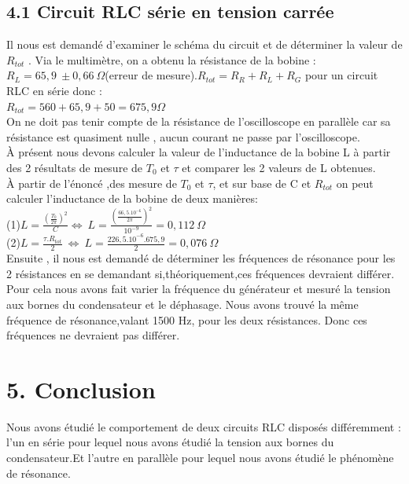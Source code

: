 \documentclass{report}
\begin{document}
\subsection*{4.1 Circuit RLC série en tension carrée}
Il nous est demandé d'examiner le schéma du circuit et de déterminer la valeur de $R_{tot}$ .
Via le multimètre, on a  obtenu la résistance de la bobine : $R_L=65,9\ \pm0,66\ \Omega$(erreur de mesure).$R_{tot}=R_R+R_L+R_G$ pour un circuit RLC en série donc : \\
\hspace*{5cm} $R_{tot}=560+65,9+50=675,9\Omega$\\
On ne doit pas tenir compte de la résistance de l'oscilloscope en parallèle car sa résistance est quasiment nulle , aucun courant ne passe par l'oscilloscope.\\
À présent nous devons calculer la valeur de l'inductance de la bobine L à partir des 2 résultats de mesure de $T_0$ et $\tau$ et comparer les 2 valeurs de L obtenues.\\ À partir de l'énoncé ,des mesure de $T_0$ et $\tau$, et sur base de C et $R_{tot}$ on peut calculer l'inductance de la bobine de deux manières:\\
\hspace*{2cm}(1)$L=\frac{\left({\frac{T_0}{2\pi}}\right)^2}{C} \Leftrightarrow $$ \ L = \frac{{\left(\frac{66,5.10^{-6}}{2\pi}\right)}^2}{10^{-9}}=0,112\ \Omega$
\\
\hspace*{2cm}(2)$L=\frac{\tau .R_{tot}}{2} \ $$ \Leftrightarrow $$ \ L=\frac{226,5.10^{-6}.675,9}{2}=0,076\ \Omega$\\
Ensuite , il nous est demandé de déterminer les fréquences de résonance pour les 2 résistances en se demandant si,théoriquement,ces fréquences devraient différer.
Pour cela nous avons fait varier la fréquence du générateur et mesuré  la tension aux bornes du condensateur et le déphasage. Nous
avons trouvé la même fréquence de résonance,valant 1500 Hz, pour les deux résistances.  Donc ces fréquences ne devraient pas différer.

\section*{5. Conclusion}
Nous avons étudié le comportement de deux circuits RLC disposés
différemment : l'un en série pour lequel nous avons étudié la tension aux bornes du condensateur.Et l’autre en parallèle pour lequel nous avons étudié le phénomène de résonance.
\end{document}
